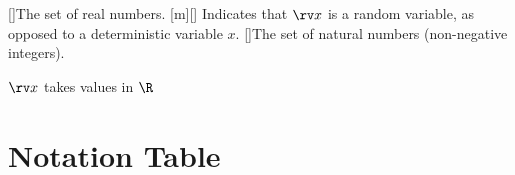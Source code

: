\documentclass{article}
\begin{document}
[\R]{The set of real numbers.}
\DeclareNotation{\rv}[m]{}[]{
  Indicates that $\rv x$ is a random variable, as opposed to a deterministic variable $x$.
}
[\N]{The set of natural numbers (non-negative integers).}

$\rv x$ takes values in $\R$

\section*{Notation Table}
\NotationUsedTable
\end{document}
